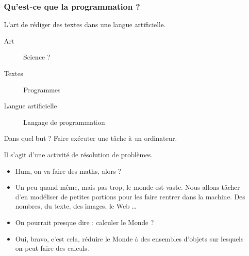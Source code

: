 \documentclass[10pt]{beamer}
\begin{document}
\begin{frame}
  \frametitle{Qu'est-ce que la programmation ?}
  \begin{alertblock}{  L'art de rédiger des textes dans une langue artificielle.}
    \begin{description}
    \item[Art] Science ?
    \item[Textes] Programmes
    \item[Langue artificielle] Langage de programmation
    \end{description}
  \end{alertblock}

  \begin{block}{Dans quel but ?}
    Faire exécuter une tâche à un ordinateur.
  \end{block}

  \begin{block}{Il s'agit d'une activité de résolution de problèmes.}
    \begin{itemize}
    \item Hum, on va faire des maths, alors ?
    \item Un peu quand même, mais pas trop, le monde est vaste. Nous allons tâcher d'en modéliser de petites portions pour les faire rentrer dans la machine. Des nombres, du texte, des images, le Web \dots
    \item On pourrait presque dire : calculer le Monde ?
    \item Oui, bravo, c'est cela, \alert{réduire le Monde à des ensembles d'objets sur lesquels on peut faire des calculs.}
    \end{itemize}
  \end{block}
\end{frame}
\end{document}

